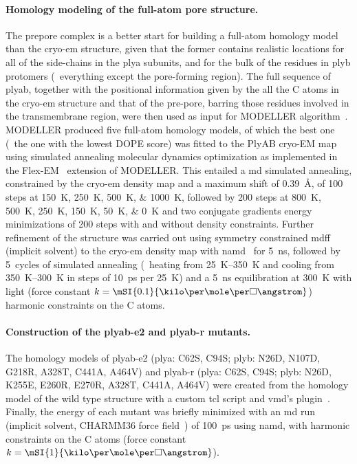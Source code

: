 \paragraph{Homology modeling of the full-atom pore structure.}
%
The prepore complex is a better start for building a full-atom homology model than the \gls{cryo-em}
structure, given that the former contains realistic locations for all of the side-chains in the \gls{plya}
subunits, and for the bulk of the residues in \gls{plyb} protomers (\ie~everything except the pore-forming
region). The full sequence of \gls{plyab}, together with the positional information given by the all the
C\ta{} atoms in the \gls{cryo-em} structure and that of the pre-pore, barring those residues involved in the
transmembrane region, were then used as input for MODELLER  algorithm~\cite{Sali-1993}.
MODELLER produced five full-atom homology models, of which the best one (\ie~the one with the lowest DOPE
score) was fitted to the PlyAB cryo-EM map using simulated annealing molecular dynamics optimization as
implemented in the Flex-EM~\cite{Topf-2008} extension of MODELLER. This entailed a \gls{md} simulated
annealing, constrained by the \gls{cryo-em} density map and a maximum shift of \SI{0.39}{\angstrom}, of 100
steps at \SIlist{150;250;500;1000}{\kelvin}, followed by 200 steps at \SIlist{800;500;250;150;50;0}{\kelvin}
and two conjugate gradients energy minimizations of 200 steps with and without density constraints. Further
refinement of the structure was carried out using symmetry constrained \gls{mdff} (implicit solvent) to the
\gls{cryo-em} density map with \gls{namd}~\cite{Phillips-2005,McGreevy-2014} for \SI{5}{\ns}, followed by
5~cycles of simulated annealing (\ie~heating from \SIrange{25}{350}{\kelvin} and cooling from
\SIrange{350}{300}{\kelvin} in steps of \SI{10}{ps} per \SI{25}{\kelvin}) and a \SI{5}{\ns} equilibration at
\SI{300}{\kelvin} with light (force constant $k = \mSI{0.1}{\kilo\cal\per\mole\per\square\angstrom}$)
harmonic constraints on the C\ta{} atoms.

\paragraph{Construction of the \gls{plyab-e2} and \gls{plyab-r} mutants.}
%
The homology models of \gls{plyab-e2} (\gls{plya}: C62S, C94S; \gls{plyb}: N26D, N107D, G218R, A328T, C441A,
A464V) and \gls{plyab-r} (\gls{plya}: C62S, C94S; \gls{plyb}: N26D, K255E, E260R, E270R, A328T, C441A, A464V)
were created from the homology model of the wild type structure with a custom \gls{tcl} script and \gls{vmd}'s
 plugin~\cite{Humphrey-1996}. Finally, the energy of each mutant was briefly minimized with an
\gls{md} run (implicit solvent, CHARMM36 force field~\cite{Best-2012}) of \SI{100}{\ps} using \gls{namd}, with
harmonic constraints on the C\ta{} atoms (force constant $k =
\mSI{1}{\kilo\cal\per\mole\per\square\angstrom}$).


